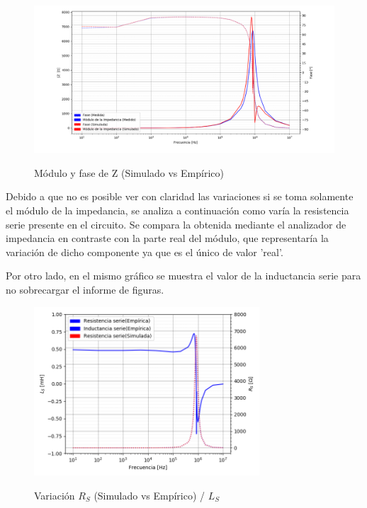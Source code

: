 \begin{figure}[H]
\centering
\includegraphics[width=1\textwidth]{Ejercicio_1(Germo)/Grafico/Inductancia_relacion_entre_Z_y_fases.png}
\label{fig:Inductancia_relacion_entre_Z_y_fases}
\caption{Módulo y fase de Z (Simulado vs Empírico)}
\end{figure}

Debido a que no es posible ver con claridad las variaciones si se toma solamente el módulo de la impedancia, se analiza a continuación como varía la resistencia serie presente en el circuito. Se compara la obtenida mediante el analizador de impedancia en contraste con la parte real del módulo, que representaría la variación de dicho componente ya que es el único de valor 'real'.\par
Por otro lado, en el mismo gráfico se muestra el valor de la inductancia serie para no sobrecargar el informe de figuras.

\begin{figure}[H]
\centering
\includegraphics[width=0.75\textwidth]{Ejercicio_1(Germo)/Grafico/Inductancia_relacion_entre_L_s_y_R_s.png}
\label{fig:Inductancia_relacion_entre_L_s_y_R_s}
\caption{Variación $R_S$ (Simulado vs Empírico) / $L_S$ }
\end{figure}

